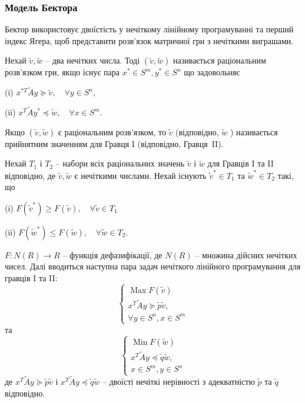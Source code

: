 \documentclass[14pt, a4paper, oneside]{extarticle}
\numberwithin{equation}{section}
\newcommand{\geqslant}{\geq}
\newcommand{\leqslant}{\leq}
\newcommand{\preccurlyeq}{\preceq}
\newcommand{\succcurlyeq}{\succeq}
\begin{document}
\subsubsection*{Модель Бектора}
Бектор використовує двоїстість у нечіткому лінійному програмуванні та перший індекс Ягера, щоб представити розв'язок матричної гри з нечіткими виграшами.

Нехай $\tilde{v}, \tilde{w}$ -- два нечітких числа. Тоді $(\tilde{v}, \tilde{w})$ називається {раціональним розв'язком гри}, якщо існує пара $x^{*} \in S^{m}, y^{*} \in S^{n}$ що задовольняє

(i) $x^{* T} \tilde{A} y \succcurlyeq \tilde{v}, \quad \forall y \in S^{n}$,

(ii) $x^{T} \tilde{A} y^{*} \preccurlyeq \tilde{w}, \quad \forall x \in S^{m}$.

Якщо $(\tilde{v}, \tilde{w})$ є раціональним розв'язком, то $\tilde{v}$ (відповідно, $\tilde{w}$ ) називається {прийнятним значенням} для Гравця I (відповідно, Гравця~II).

Нехай $T_{1}$ і $T_{2}$ -- набори всіх раціональних значень $\tilde{v}$ і $\tilde{w}$ для Гравців I та II відповідно, де $\tilde{v}, \tilde{w}$ є нечіткими числами. Нехай існують $\tilde{v}^{*} \in T_{1}$ та $\tilde{w}^{*} \in T_{2}$ такі, що

(i) $F\left(\tilde{v}^{*}\right) \geqslant F(\tilde{v}), \quad \forall \tilde{v} \in T_{1}$

(ii) $F\left(\tilde{w}^{*}\right) \leqslant F(\tilde{w}), \quad \forall \tilde{w} \in T_{2}$.

$F: N(R) \rightarrow R$ -- {функція дефазифікації}, де $N(R)$ -- множина дійсних нечітких чисел. Далі вводиться наступна пара задач нечіткого лінійного програмування для гравців I та II:
\begin{equation*}
\begin{cases}
\operatorname{Max} F(\tilde{v})\\
x^{T} \tilde{A} y \succcurlyeq \tilde{p} \tilde{v},\\ \forall y \in S^{n}, x \in S^{m}
\end{cases}
\end{equation*}
та
\begin{equation*}
\begin{cases}
\operatorname{Min} F(\tilde{w})\\
x^{T} \tilde{A} y \preccurlyeq \tilde{q} \tilde{w},\\ x \in S^{m}, y \in S^{n}
\end{cases}
\end{equation*}
де $x^{T} \tilde{A} y \succcurlyeq \tilde{p} \tilde{v}$ і $x^{T} \tilde{A} y \preccurlyeq \tilde{q} \tilde{w }$
-- двоїсті нечіткі нерівності з адекватністю $\tilde{p}$ та $\tilde{q}$ відповідно. 
\end{document}
